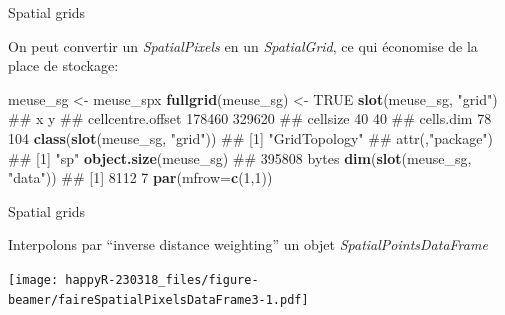 \documentclass[8pt,ignorenonframetext,]{beamer}
\newenvironment{Shaded}{\begin{snugshade}}{\end{snugshade}}
\newcommand{\KeywordTok}[1]{\textcolor[rgb]{0.13,0.29,0.53}{\textbf{{#1}}}}
\newcommand{\DataTypeTok}[1]{\textcolor[rgb]{0.13,0.29,0.53}{{#1}}}
\newcommand{\DecValTok}[1]{\textcolor[rgb]{0.00,0.00,0.81}{{#1}}}
\newcommand{\StringTok}[1]{\textcolor[rgb]{0.31,0.60,0.02}{{#1}}}
\newcommand{\CommentTok}[1]{\textcolor[rgb]{0.56,0.35,0.01}{\textit{{#1}}}}
\newcommand{\OtherTok}[1]{\textcolor[rgb]{0.56,0.35,0.01}{{#1}}}
\newcommand{\NormalTok}[1]{{#1}}
\begin{document}
\begin{frame}[fragile]{Spatial grids}

On peut convertir un \emph{SpatialPixels} en un \emph{SpatialGrid}, ce
qui économise de la place de stockage:

\begin{Shaded}
\begin{Highlighting}[]
\NormalTok{meuse_sg <-}\StringTok{ }\NormalTok{meuse_spx}
\KeywordTok{fullgrid}\NormalTok{(meuse_sg) <-}\StringTok{ }\OtherTok{TRUE} 
\KeywordTok{slot}\NormalTok{(meuse_sg, }\StringTok{"grid"}\NormalTok{)}
\NormalTok{##                        x      y}
\NormalTok{## cellcentre.offset 178460 329620}
\NormalTok{## cellsize              40     40}
\NormalTok{## cells.dim             78    104}
\KeywordTok{class}\NormalTok{(}\KeywordTok{slot}\NormalTok{(meuse_sg, }\StringTok{"grid"}\NormalTok{))}
\NormalTok{## [1] "GridTopology"}
\NormalTok{## attr(,"package")}
\NormalTok{## [1] "sp"}
\KeywordTok{object.size}\NormalTok{(meuse_sg)}
\NormalTok{## 395808 bytes}
\KeywordTok{dim}\NormalTok{(}\KeywordTok{slot}\NormalTok{(meuse_sg, }\StringTok{"data"}\NormalTok{))}
\NormalTok{## [1] 8112    7}
\KeywordTok{par}\NormalTok{(}\DataTypeTok{mfrow=}\KeywordTok{c}\NormalTok{(}\DecValTok{1}\NormalTok{,}\DecValTok{1}\NormalTok{))}
\end{Highlighting}
\end{Shaded}

\end{frame}

\begin{frame}[fragile]{Spatial grids}

Interpolons par ``inverse distance weighting'' un objet
\emph{SpatialPointsDataFrame}

\begin{Shaded}
\end{Shaded}

\texttt{[image: happyR-230318\_files/figure-beamer/faireSpatialPixelsDataFrame3-1.pdf]}

\end{frame}
\end{document}
